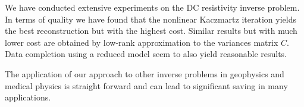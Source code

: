 \documentclass[12pt]{article}
\begin{document}
We have conducted extensive experiments on the DC resistivity inverse problem.
In terms of quality we have found that the nonlinear Kaczmartz iteration yields the best reconstruction
but with the highest cost. Similar results but with much lower cost are obtained by low-rank approximation to the variances matrix $C$. Data completion using a reduced model seem to also yield reasonable results.

The application of our approach to other inverse problems in geophysics and medical physics is straight
forward and can lead to significant saving in many applications.



\end{document}
